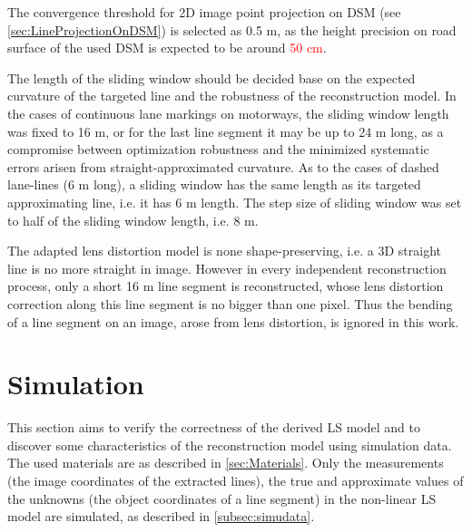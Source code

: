 The convergence threshold for 2D image point projection on DSM (see \cref{sec:LineProjectionOnDSM}) is selected as 0.5 m, as the height precision on road surface of the used DSM is expected to be around \textcolor{red}{50 cm}.


The length of the sliding window should be decided base on the expected curvature of the targeted line and the robustness of the reconstruction model. In the cases of continuous lane markings on motorways, the sliding window length was fixed to 16 m, or for the last line segment it may be up to 24 m long, as a compromise between optimization robustness and the minimized systematic errors arisen from straight-approximated curvature. As to the cases of dashed lane-lines (6 m long), a sliding window has the same length as its targeted approximating line, i.e. it has 6 m length. The step size of sliding window was set to half of the sliding window length, i.e. 8 m.









The adapted lens distortion model is none shape-preserving, i.e. a 3D straight line is no more straight in image. However in every independent reconstruction process, only a short 16 m line segment is reconstructed, whose lens distortion correction along this line segment is no bigger than one pixel. Thus the bending of a line segment on an image, arose from lens distortion, is ignored in this work. 



\section{Simulation}
\label{sec:simulation}
This section aims to verify the correctness of the derived LS model and to discover some characteristics of the reconstruction model using simulation data. The used materials are as described in \cref{sec:Materials}. Only the measurements (the image coordinates of the extracted lines), the true and approximate values of the unknowns (the object coordinates of a line segment) in the non-linear LS model are simulated, as described in \cref{subsec:simudata}.


